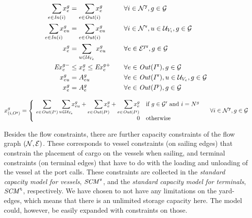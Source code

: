 \begin{alignat}{5}    
\label{OnOff}
\so[r]{\sum_{e\in \mi{In}(i)}} x^{g}_{e}	&= \so[r]{\sum_{e\in \mi{Out}(i)}}x^{g}_{e} &&\forall i\in \mc{N}^\ttt{y}, g\in \mc{G}\\
%
\label{secOnOff}
\so[r]{\sum_{e\in \mi{In}(i)}} x^{g}_{eu}	&= \so[r]{\sum_{e\in \mi{Out}(i)}}x^{g}_{eu}&& \forall i\in \mc{N}^\ttt{v}, u\in \mc{U}_{V_i}, g\in \mc{G} \\
%
\label{sumVars1}
x^g_{e} 									&= \sum_{u\in \mc{U}_{V_e}} x^{g}_{eu}		&& \forall e\in \mc{E}^\ttt{yv}, g\in\mc{G}\\
%
\label{exportLimits} \mi{Ex}^{g-}_e			&\leq x^g_{e}\leq \mi{Ex}^{g+}_e\quad		&& \forall e\in \mi{Out}(I^\ttt{x}), g\in \mc{G} \\
\label{onboard} 			x^{g}_{eu} 		&= A^{g}_{eu}								&& \forall e\in\mi{Out}(I^\ttt{v}), u\in \mc{U}_{V_e}, g\in \mc{G}\\
\label{sourceYard} 		x^g_{e} 			&= A^g_{e}									&& \forall e\in \mi{Out}(I^\ttt{p}), g\in \mc{G}
\end{alignat}

\begin{equation}\label{sinks}
x^g_{(i,O^\ttt{x})} = 
\left\{\begin{array}{rl}
		\quad\so[l]{\sum_{e\in\mi{Out}(I^\ttt{v})}}\so[r]{\sum_{u\in\mc{U}_{V_e}}} x^g_{eu} + \so[r]{\sum_{e\in \mi{Out}(I^\ttt{p})}} x^g_e + \so[r]{\sum_{e\in \mi{Out}(I^\ttt{x})}} x^g_{e}							 							 	& \text{if } g\in \mc{G}' \text{ and } i = N^g\\
													0	& \text{otherwise}\end{array}\right.				
\quad \forall i\in \mc{N}^\ttt{y}, g\in\mc{G}
\end{equation}

Besides the flow constraints, there are further capacity constraints of the flow graph $(\mathcal{N},\mathcal{E})$. These corresponds to vessel constraints (on sailing edges) that constrain the placement of cargo on the vessels when sailing, and terminal constraints (on terminal edges) that have to do with the loading and unloading of the vessel at the port calls. These constraints are collected in the \emph{standard capacity model for vessels}, $\mathit{SCM}^\texttt{v}$, and the \emph{standard capacity model for terminals}, $\mathit{SCM}^\texttt{t}$, respectively. We have chosen to not have any limitations on the yard-edges, which means that there is an unlimited storage capacity here. The model could, however, be easily expanded with constraints on those. 

